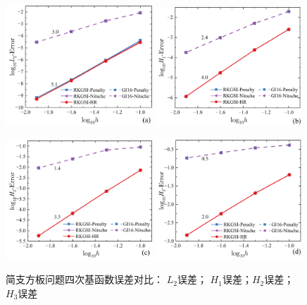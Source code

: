 \newpage
\begin{figure}[H]
    \centering
    \begin{subcaptiongroup}
    \includegraphics[width=0.49\textwidth]{figure/PHR/R/QL2.png}
    \label{QL2}
    \includegraphics[width=0.49\textwidth]{figure/PHR/R/QH1.png}
    \label{QH1}
    \end{subcaptiongroup}
    \begin{subcaptiongroup}
    \includegraphics[width=0.49\textwidth]{figure/PHR/R/QH2.png}
    \label{QH2}
    \includegraphics[width=0.49\textwidth]{figure/PHR/R/QH3.png}
    \label{QH3}
    \end{subcaptiongroup}
\caption{简支方板问题四次基函数误差对比： $L_2$误差； $H_1$误差；$H_2$误差； $H_3$误差}
\label{RQLH}
\end{figure}
